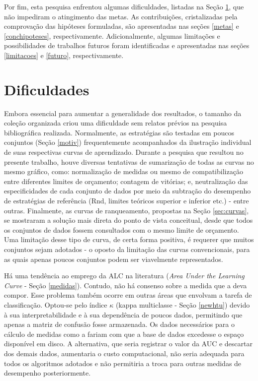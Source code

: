 Por fim, esta pesquisa enfrentou algumas dificuldades, listadas na Seção \ref{difi}, que não impediram o atingimento das metas.
As contribuições, cristalizadas pela comprovação das hipóteses formuladas, são apresentadas nas seções \ref{metas} e \ref{conchipoteses}, respectivamente.
Adicionalmente, algumas limitações e possibilidades de trabalhos futuros foram identificadas e apresentadas nas seções \ref{limitacoes} e \ref{futuro}, respectivamente.

\section{Dificuldades}\label{difi}
Embora essencial para aumentar a generalidade dos resultados, o tamanho da coleção organizada criou uma dificuldade sem relatos prévios na pesquisa bibliográfica realizada.
Normalmente, as estratégias são testadas em poucos conjuntos (Seção \ref{motiv}) frequentemente acompanhados da ilustração individual de suas respectivas curvas de aprendizado.
Durante a pesquisa que resultou no presente trabalho, houve diversas tentativas de sumarização de todas as curvas no mesmo gráfico, como: normalização de medidas ou mesmo de compatibilização entre diferentes limites de orçamento; contagem de vitórias; e, neutralização das especificidades de cada conjunto de dados por meio da subtração do desempenho de estratégias de referência (Rnd, limites teóricos superior e inferior etc.) - entre outras. 
Finalmente, as curvas de ranqueamento, propostas na Seção \ref{sec:curvas}, se mostraram a solução mais direta do ponto de vista conceitual, desde que todos os conjuntos de dados fossem consultados com o mesmo limite de orçamento.
Uma limitação desse tipo de curva, de certa forma positiva, é requerer que muitos conjuntos sejam adotados - o oposto da limitação das curvas convencionais, para as quais apenas poucos conjuntos podem ser viavelmente representados.

Há uma tendência ao emprego da ALC na literatura (\textit{Area Under the Learning Curve} - Seção \ref{medidas}).
Contudo, não há consenso sobre a medida que a deva compor.
Esse problema também ocorre em outras áreas que envolvam a tarefa de classificação.
Optou-se pelo índice $\kappa$ (kappa multiclasse - Seção \ref{newhtu}) devido à sua interpretabilidade e à sua dependência de poucos dados, permitindo que apenas a matriz de confusão fosse armazenada.
Os dados necessários para o cálculo de medidas como a  \cite{lobo2008auc} fariam com que a base de dados excedesse o espaço disponível em disco.
A alternativa, que seria registrar o valor da AUC e descartar dos demais dados, aumentaria o custo computacional, não seria adequada para todos os algoritmos adotados e não permitiria a troca para outras medidas de desempenho posteriormente.


